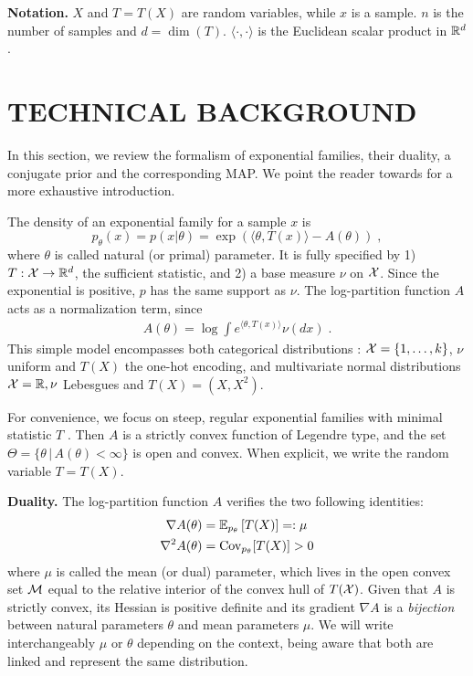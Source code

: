 \documentclass[twoside]{article}
\let\oldsection\section
\renewcommand{\section}[1]{\oldsection{\texorpdfstring{\uppercase{#1}}{#1}}}
\newcommand*{\expect}[2][]{\ensuremath{\mathbb{E}_{#1} \left[ #2 \right] }} %
\newcommand{\cond}{\,\vert\,}
\newcommand{\logpart}{A}
\newcommand{\nat}{\theta}
\newcommand{\m}{\mu}
\newcommand{\meanp}{\m}
\begin{document}
{\bf Notation.}
$X$ and $T=T(X)$ are random variables, while $x$ is a sample.
$n$ is the number of samples and $d= \dim(T)$.
$\langle \cdot , \cdot \rangle$ is the Euclidean scalar product in $\mathbb{R}^d$.


\section{Technical background}
\label{sec:background}
In this section, we review the formalism of exponential families, their duality, a conjugate prior and the corresponding MAP.
We point the reader towards \citet[Chapter 3]{wainwright2008graphical} for a more exhaustive introduction.


The density of an exponential family for a sample $x$ is
\begin{equation}
	 p_\nat(x) = p(x|\nat) = \exp( \langle \nat, T(x) \rangle - \logpart(\nat)) \; ,
	 \label{eq:def_expfamily}
\end{equation}
where  $\nat$ is called natural (or primal) parameter.
It is fully specified by 1) $T: {\mathcal X} \rightarrow \mathbb{R}^d$, the sufficient statistic,
and 2) a base measure $\nu$ on ${\mathcal X}$.
Since the exponential is positive, $p$ has the same support as $\nu$.
The log-partition function $\logpart$ acts as a normalization term, since
\begin{align}
    \logpart(\nat) = \log \int e^{\langle \nat, T(x) \rangle} \nu(dx) \;.
\end{align}
This simple model encompasses both categorical distributions : ${\mathcal X} = \{1, \dots, k\}$, $\nu$ uniform and $T(X)$  the one-hot encoding, and multivariate normal distributions ${\mathcal X}=\mathbb{R}, \nu$ Lebesgues and $T(X)=(X, X^2)$.

For convenience, we focus on steep, regular exponential families with minimal statistic $T$ \citep{barndoffnielsen2014information}.
Then $\logpart$ is a strictly convex function of Legendre type,
and the set $\Theta = \{ \nat \cond \logpart(\nat) < \infty\}$ is open and convex.
When explicit, we write the random variable $T = T(X)$.


{\bf Duality.}
The log-partition function $\logpart$ verifies the two following identities:
\begin{align}
    \nabla\logpart(\nat) &=  \expect[p_\nat]{T(X)} =: \meanp \\
    \nabla^2 \logpart(\nat) &= \Cov_{p_\nat}[T(X)] > 0
\end{align}
where $\meanp$ is called the mean (or dual) parameter, which lives in the open convex set ${\mathcal M}$ equal to the relative interior of the convex hull of $T({\mathcal X})$.
Given that $\logpart$ is strictly convex, its Hessian is positive definite and its gradient $\nabla \logpart$ is a \textit{bijection} between natural parameters $\nat$ and mean parameters $\m$.
We will write interchangeably $\m$ or  $\nat$ depending on the context, being aware that both are linked and represent the same distribution.
\end{document}
